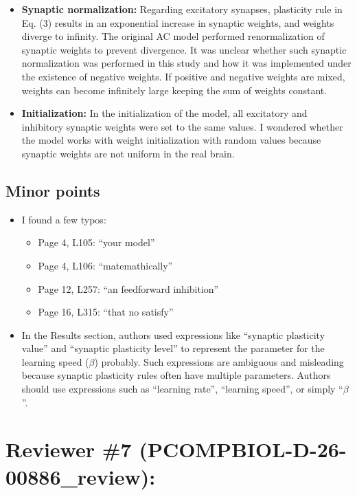 \documentclass[a4paper, 11pt]{article}
\begin{document}
\begin{itemize}
    \item \textbf{Synaptic normalization:} Regarding excitatory synapses, plasticity rule in Eq. (3) results in an exponential increase in synaptic weights, and weights diverge to infinity. The original AC model performed renormalization of synaptic weights to prevent divergence. It was unclear whether such synaptic normalization was performed in this study and how it was implemented under the existence of negative weights. If positive and negative weights are mixed, weights can become infinitely large keeping the sum of weights constant.
    
    \item \textbf{Initialization:} In the initialization of the model, all excitatory and inhibitory synaptic weights were set to the same values. I wondered whether the model works with weight initialization with random values because synaptic weights are not uniform in the real brain.
\end{itemize}

\subsection*{Minor points}

\begin{itemize}
    \item I found a few typos:
    \begin{itemize}
        \item Page 4, L105: ``your model''
        \item Page 4, L106: ``matemathically''
        \item Page 12, L257: ``an feedforward inhibition''
        \item Page 16, L315: ``that no satisfy''
    \end{itemize}
    
    \item In the Results section, authors used expressions like ``synaptic plasticity value'' and ``synaptic plasticity level'' to represent the parameter for the learning speed ($\beta$) probably. Such expressions are ambiguous and misleading because synaptic plasticity rules often have multiple parameters. Authors should use expressions such as ``learning rate'', ``learning speed'', or simply ``$\beta$''.
\end{itemize}

\section*{Reviewer \#7 (PCOMPBIOL-D-26-00886\_review):}
\end{document}
